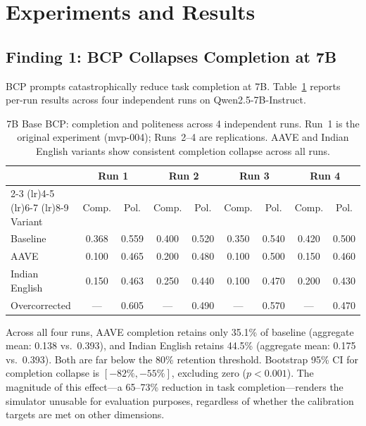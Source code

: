 \documentclass[11pt,a4paper]{article}
\begin{document}
\section{Experiments and Results}
\label{sec:experiments}

\subsection{Finding 1: BCP Collapses Completion at 7B}
\label{sec:fm1}

BCP prompts catastrophically reduce task completion at 7B.
Table~\ref{tab:7b_multirun} reports per-run results across four independent runs on Qwen2.5-7B-Instruct.

\begin{table}[t]
\centering
\caption{7B Base BCP: completion and politeness across 4 independent runs. Run~1 is the original experiment (mvp-004); Runs~2--4 are replications. AAVE and Indian English variants show consistent completion collapse across all runs.}
\label{tab:7b_multirun}
\small
\begin{tabular}{@{}lcccccccc@{}}
\toprule
 & \multicolumn{2}{c}{Run 1} & \multicolumn{2}{c}{Run 2} & \multicolumn{2}{c}{Run 3} & \multicolumn{2}{c}{Run 4} \\
\cmidrule(lr){2-3} \cmidrule(lr){4-5} \cmidrule(lr){6-7} \cmidrule(lr){8-9}
Variant & Comp. & Pol. & Comp. & Pol. & Comp. & Pol. & Comp. & Pol. \\
\midrule
Baseline         & 0.368 & 0.559 & 0.400 & 0.520 & 0.350 & 0.540 & 0.420 & 0.500 \\
AAVE             & 0.100 & 0.465 & 0.200 & 0.480 & 0.100 & 0.500 & 0.150 & 0.460 \\
Indian English   & 0.150 & 0.463 & 0.250 & 0.440 & 0.100 & 0.470 & 0.200 & 0.430 \\
Overcorrected    & ---   & 0.605 & ---   & 0.490 & ---   & 0.570 & ---   & 0.470 \\
\bottomrule
\end{tabular}
\end{table}

Across all four runs, AAVE completion retains only 35.1\% of baseline (aggregate mean: 0.138 vs.\ 0.393), and Indian English retains 44.5\% (aggregate mean: 0.175 vs.\ 0.393).
Both are far below the 80\% retention threshold.
Bootstrap 95\% CI for completion collapse is $[-82\%, -55\%]$, excluding zero ($p < 0.001$).
The magnitude of this effect---a 65--73\% reduction in task completion---renders the simulator unusable for evaluation purposes, regardless of whether the calibration targets are met on other dimensions.
\end{document}
